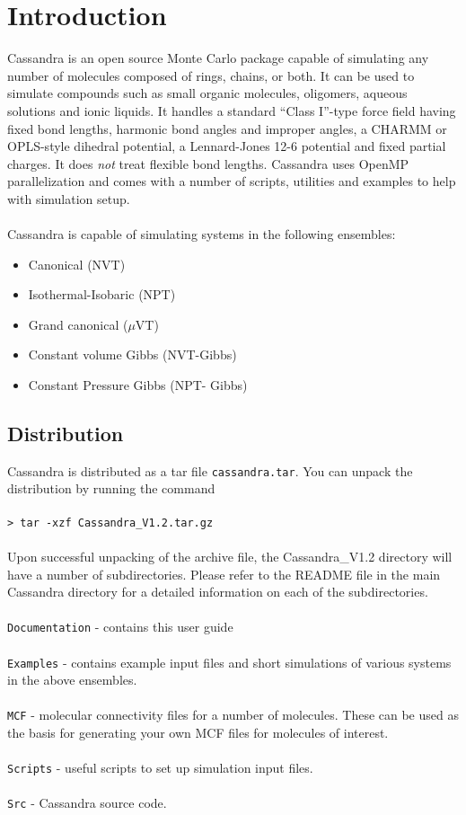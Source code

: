 \chapter{Introduction}
Cassandra is an open source Monte Carlo package capable of simulating
any number of molecules composed of rings, chains, or both. It can be
used to simulate compounds such as small organic molecules, oligomers,
aqueous solutions and ionic liquids. It handles a standard ``Class
I''-type force field having fixed bond lengths, harmonic bond angles
and improper angles, a CHARMM or OPLS-style dihedral potential, a
Lennard-Jones 12-6 potential and fixed partial charges. It does {\em
  not} treat flexible bond lengths. Cassandra uses OpenMP parallelization and comes
with a number of scripts, utilities and examples to help with
simulation setup. \\ \\ 
%
Cassandra is capable of simulating systems in the following ensembles: \\ 
%
\begin{itemize}
\item Canonical (NVT) 
\item Isothermal-Isobaric (NPT) 
\item Grand canonical ($\mu$VT) 
\item Constant volume Gibbs (NVT-Gibbs) 
\item Constant Pressure Gibbs (NPT- Gibbs)
\end{itemize}

\section{Distribution}
Cassandra is distributed as a tar file \texttt{cassandra.tar}. You can unpack the distribution by running the command \\ \\
%
\texttt{> tar -xzf Cassandra\_V1.2.tar.gz} \\ \\
%
Upon successful unpacking of the archive file, the Cassandra\_V1.2 directory will have a number of subdirectories. Please refer to the README file in the main Cassandra directory for a detailed information on each of the subdirectories. \\ \\
%
\texttt{Documentation} - contains this user guide\\ \\
%
\texttt{Examples} - contains example input files and short simulations of various systems in the above ensembles. \\ \\
%
\texttt{MCF} - molecular connectivity files for a number of
molecules. These can be used as the basis for generating your own MCF files for
molecules of interest. \\ \\ 
%
\texttt{Scripts} - useful scripts to set up simulation input files. \\ \\
%
\texttt{Src} - Cassandra source code. \\ \\
